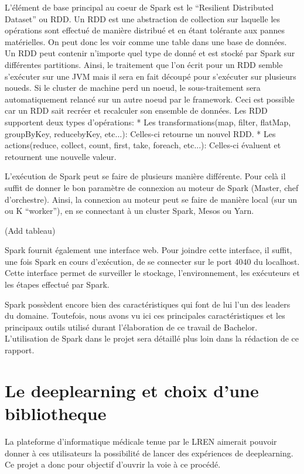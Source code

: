 \documentclass[a4paper,10pt,openany,oneside]{sphinxmanual}
\begin{document}
L'élément de base principal au coeur de Spark est le ``Resilient Distributed Dataset'' ou RDD. Un RDD est une abstraction de collection sur laquelle les opérations sont effectué
de manière distribué et en étant tolérante aux pannes matérielles. On peut donc les voir comme une table dans une base de données. Un RDD peut contenir n'importe quel type de donné
et est stocké par Spark sur différentes partitions. Ainsi, le traitement que l'on écrit pour un RDD semble s'exécuter sur une JVM mais il sera en fait découpé pour s'exécuter sur plusieurs
noueds. Si le cluster de machine perd un noeud, le sous-traitement sera automatiquement relancé sur un autre noeud par le framework. Ceci est possible car un RDD sait recréer et recalculer
son ensemble de données. Les RDD supportent deux types d'opérations:
* Les transformations(map, filter, flatMap, groupByKey, reducebyKey, etc...): Celles-ci retourne un nouvel RDD.
* Les actions(reduce, collect, count, first, take, foreach, etc...): Celles-ci évaluent et retournent une nouvelle valeur.

L'exécution de Spark peut se faire de plusieurs manière différente. Pour celà il suffit de donner le bon paramètre de connexion au moteur de Spark (Master, chef d'orchestre). Ainsi, la connexion
au moteur peut se faire de manière local (sur un ou K ``worker''), en se connectant à un cluster Spark, Mesos ou Yarn.

(Add tableau)

Spark fournit également une interface web. Pour joindre cette interface, il suffit, une fois Spark en cours d'exécution, de se connecter sur le port 4040 du localhost. Cette interface permet de
surveiller le stockage, l'environnement, les exécuteurs et les étapes effectué par Spark.

Spark possèdent encore bien des caractéristiques qui font de lui l'un des leaders du domaine. Toutefois, nous avons vu ici ces principales caractéristiques et les principaux outils utilisé durant
l'élaboration de ce travail de Bachelor. L'utilisation de Spark dans le projet sera détaillé plus loin dans la rédaction de ce rapport.


\section{Le deeplearning et choix d'une bibliotheque}
\label{index:le-deeplearning-et-choix-d-une-bibliotheque}
La plateforme d'informatique médicale tenue par le LREN aimerait pouvoir donner à ces utilisateurs la possibilité de lancer des expériences
de deeplearning. Ce projet a donc pour objectif d'ouvrir la voie à ce procédé.
\end{document}
